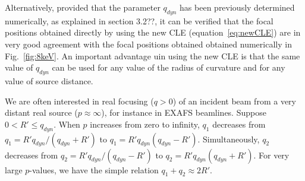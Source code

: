 \documentclass[preprint]{iucr}              %
\newcommand{\inred}[1]{{\color{red}#1}}
\begin{document}
\inred{Alternatively, provided that the parameter $q_{dyn}$ has been previously determined numerically, as explained in section 3.2??, it can be verified that the focal positions obtained directly by using the new CLE (equation~\ref{eq:newCLE}) are in very good agreement with the focal positions obtained obtained numerically in Fig.~\ref{fig:8keV}. An important advantage uin using the new CLE is that the same value of $q_{dyn}$ can be used for any value of the radius of curvature and for any value of source distance. 
}

We are often interested in real focusing ($q>0$) of an incident beam from a very distant real source ($p\approx \infty$), for instance in EXAFS beamlines. 
Suppose $0<R'\le q_{dyn}$. When $p$ increases from zero to infinity, $q_1$ decreases from $q_1=R'q_{dyn}/(q_{dyn}+R')$ to 
$q_1=R' q_{dyn}(q_{dyn}-R')$.
Simultaneously, $q_2$ decreases from $q_2=R'q_{dyn}/(q_{dyn}-R')$ to 
$q_2=R'q_{dyn}(q_{dyn}+R')$.
For very large $p$-values, we have the simple relation $q_1+q_2\approx 2R'$.
\end{document}
